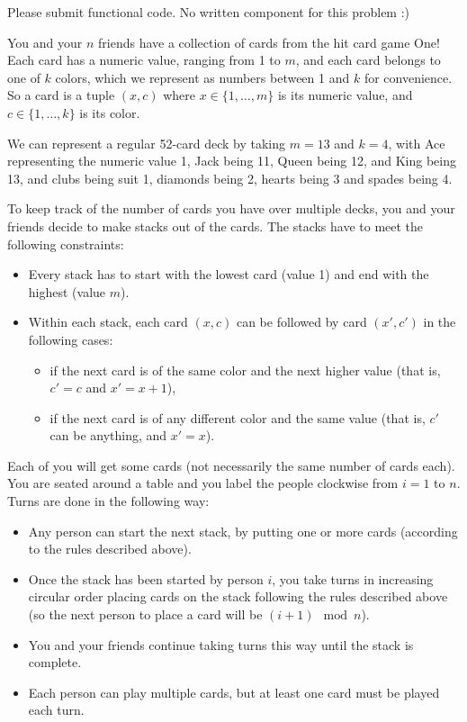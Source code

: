 \documentclass{hw}
\begin{document}
\begin{solution}
Please submit functional code. No written component for this problem :)
\end{solution}

\newpage

\begin{challenge}
You and your \(n\) friends have a collection of cards from the hit card game One! Each card has a numeric value, ranging from 1 to \(m\), and each card belongs to one of \(k\) colors, which we represent as numbers between 1 and \(k\) for convenience. So a card is a tuple \((x, c)\) where \(x \in \{1, \dots , m\}\) is its numeric value, and \(c \in \{1, \dots , k\}\) is its color.

We can represent a regular 52-card deck by taking \(m = 13\) and \(k = 4\), with Ace representing the numeric value 1, Jack being 11, Queen being 12, and King being 13, and clubs being suit 1, diamonds being 2, hearts being 3 and spades being 4.

To keep track of the number of cards you have over multiple decks, you and your friends decide to make stacks out of the cards. The stacks have to meet the following constraints:
\begin{itemize}
    \item Every stack has to start with the lowest card (value 1) and end with the highest (value \(m\)).
    \item Within each stack, each card \((x, c)\) can be followed by card \((x', c')\) in the following cases:
    \begin{itemize}
        \item if the next card is of the same color and the next higher value (that is, \(c' = c\) and \(x' = x + 1\)),
        \item if the next card is of any different color and the same value (that is, \(c'\) can be anything, and \(x' = x\)).
    \end{itemize}
\end{itemize}

Each of you will get some cards (not necessarily the same number of cards each). You are seated around a table and you label the people clockwise from \(i = 1\) to \(n\). Turns are done in the following way:
\begin{itemize}
    \item Any person can start the next stack, by putting one or more cards (according to the rules described above).
    \item Once the stack has been started by person \(i\), you take turns in increasing circular order placing cards on the stack following the rules described above (so the next person to place a card will be \((i + 1) \mod n\)).
    \item You and your friends continue taking turns this way until the stack is complete.
    \item Each person can play multiple cards, but at least one card must be played each turn.
\end{itemize}


\end{challenge}
\end{document}
